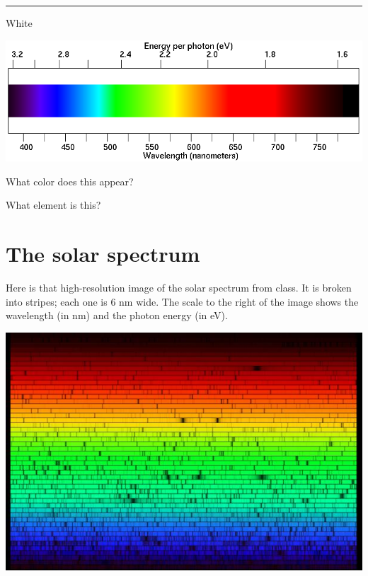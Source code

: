 \documentclass[11pt]{article}
\begin{document}
\vspace{1in}
\hrule
\begin{minipage}{0.1\textwidth}
	\begin{center}
		\large White
	\end{center}
\end{minipage}
\begin{minipage}{0.8\textwidth}
	\includegraphics[width=\textwidth]{spectrum2.png}
\end{minipage}

\begin{minipage}{0.5\textwidth}
	What color does this appear?
\end{minipage}
\begin{minipage}{0.5\textwidth}
	What element is this?
\end{minipage}
\begin{minipage}{0.5\textwidth}
\end{minipage}

\newpage

\section{The solar spectrum}

Here is that high-resolution image of the solar spectrum from class. It is broken into stripes; each one is 6 nm
wide. The scale to the right of the image shows the wavelength (in nm) and the photon energy (in eV).
\begin{center}
\includegraphics[width=1.0\textwidth]{solarspectrum.jpg}
\end{center}
\end{document}
